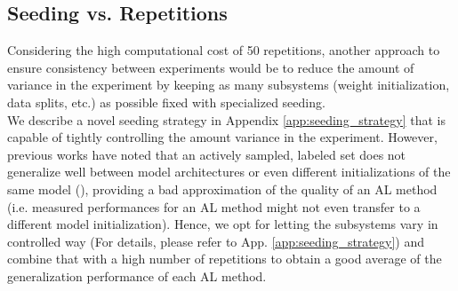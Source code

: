 \documentclass[]{article}
\begin{document}
\subsection{Seeding vs. Repetitions}\label{sec:reproducibility}
Considering the high computational cost of 50 repetitions, another approach to ensure consistency between experiments would be to reduce the amount of variance in the experiment by keeping as many subsystems (weight initialization, data splits, etc.) as possible fixed with specialized seeding. \\
We describe a novel seeding strategy in Appendix \ref{app:seeding_strategy} that is capable of tightly controlling the amount variance in the experiment.
However, previous works have noted that an actively sampled, labeled set does not generalize well between model architectures or even different initializations of the same model (\cite{zhou2021towards, lowell2018practical}), providing a bad approximation of the quality of an AL method (i.e. measured performances for an AL method might not even transfer to a different model initialization).
Hence, we opt for letting the subsystems vary in controlled way (For details, please refer to App. \ref{app:seeding_strategy}) and combine that with a high number of repetitions to obtain a good average of the generalization performance of each AL method. 


\end{document}
